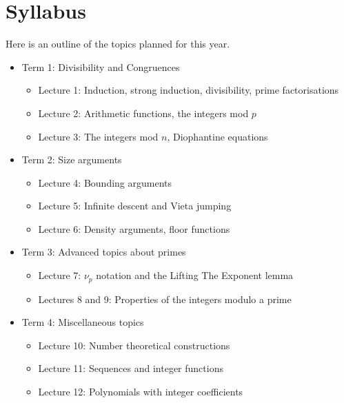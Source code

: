 \documentclass{article}
\begin{document}
\section{Syllabus}
Here is an outline of the topics planned for this year.
\begin{itemize}
  \item Term 1: Divisibility and Congruences
    \begin{itemize}
      \item Lecture 1: Induction, strong induction, divisibility, prime
        factorisations
      \item Lecture 2: Arithmetic functions, the integers mod $p$
      \item Lecture 3: The integers mod $n$, Diophantine equations
    \end{itemize}
  \item Term 2: Size arguments
    \begin{itemize}
      \item Lecture 4: Bounding arguments
      \item Lecture 5: Infinite descent and Vieta jumping
      \item Lecture 6: Density arguments, floor functions
    \end{itemize}
  \item Term 3: Advanced topics about primes
    \begin{itemize}
      \item Lecture 7: $\nu_p$ notation and the Lifting The Exponent lemma
      \item Lectures 8 and 9: Properties of the integers modulo a prime
    \end{itemize}
  \item Term 4: Miscellaneous topics
    \begin{itemize}
      \item Lecture 10: Number theoretical constructions
      \item Lecture 11: Sequences and integer functions
      \item Lecture 12: Polynomials with integer coefficients
    \end{itemize}
\end{itemize}
\end{document}
